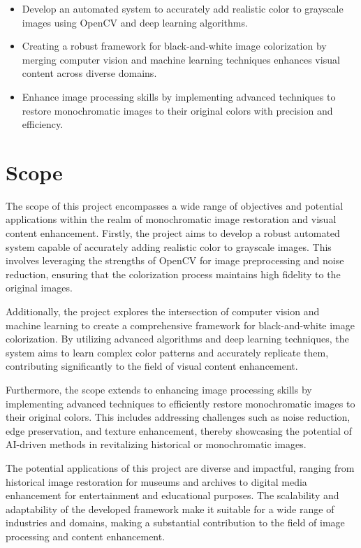 \begin{itemize}
    \item Develop an automated system to accurately add realistic color to grayscale images using OpenCV and deep learning algorithms.
    \item Creating a robust framework for black-and-white image colorization by merging computer vision and machine learning techniques enhances visual content across diverse domains.
    \item Enhance image processing skills by implementing advanced techniques to restore monochromatic images to their original colors with precision and efficiency.
\end{itemize}
\section{Scope}
The scope of this project encompasses a wide range of objectives and potential applications within the realm of monochromatic image restoration and visual content enhancement. Firstly, the project aims to develop a robust automated system capable of accurately adding realistic color to grayscale images. This involves leveraging the strengths of OpenCV for image preprocessing and noise reduction, ensuring that the colorization process maintains high fidelity to the original images.

Additionally, the project explores the intersection of computer vision and machine learning to create a comprehensive framework for black-and-white image colorization. By utilizing advanced algorithms and deep learning techniques, the system aims to learn complex color patterns and accurately replicate them, contributing significantly to the field of visual content enhancement.

Furthermore, the scope extends to enhancing image processing skills by implementing advanced techniques to efficiently restore monochromatic images to their original colors. This includes addressing challenges such as noise reduction, edge preservation, and texture enhancement, thereby showcasing the potential of AI-driven methods in revitalizing historical or monochromatic images.

The potential applications of this project are diverse and impactful, ranging from historical image restoration for museums and archives to digital media enhancement for entertainment and educational purposes. The scalability and adaptability of the developed framework make it suitable for a wide range of industries and domains, making a substantial contribution to the field of image processing and content enhancement.
